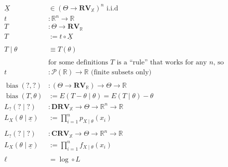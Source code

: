 \documentclass[12pt]{article}
\theoremstyle{definition}
\newcommand{\R}{\mathbb{R}}
\newcommand{\X}{\mathbb{X}}
\newcommand{\RV}{\mathbf{RV}}
\newcommand{\DRV}{\mathbf{DRV}}
\newcommand{\CRV}{\mathbf{CRV}}
\renewcommand{\P}{{\mathcal{P}}}
\DeclareMathOperator{\bias}{bias}
\begin{document}
\begin{align*}
  \underline{X} &\in (\Theta \to \RV_\X)^n\text{ i.i.d}\\
  t &: \R^n \to \R\\
  T &: \Theta \to \RV_\R\\
  T &:= t \circ \underline{X}\\
  \\
  T \mid \theta &\equiv T(\theta)\\
  \\
  &\text{for some definitions $T$ is a ``rule'' that works for any $n$, so}\\
  t &: \P(\R) \to \R\text{ (finite subsets only)}\\
  \\
  \bias(?, ?) &: (\Theta \to \RV_\R) \to \Theta \to \R\\
  \bias(T, \theta) &:= E(T - \theta \mid \theta) = E(T \mid \theta) - \theta
  \\
  L_{?}(? \mid ?) &: \DRV_\X \to \Theta \to \R^n \to \R\\
  L_X(\theta \mid \underline{x}) &:= \prod_{i = 1}^np_{X \mid \theta}(x_i)\\
  \\
  L_{?}(? \mid ?) &: \CRV_\X \to \Theta \to \R^n \to \R\\
  L_X(\theta \mid \underline{x}) &:= \prod_{i = 1}^nf_{X \mid \theta}(x_i)\\
  \\
  \ell &= \log \circ L
\end{align*}
\end{document}
